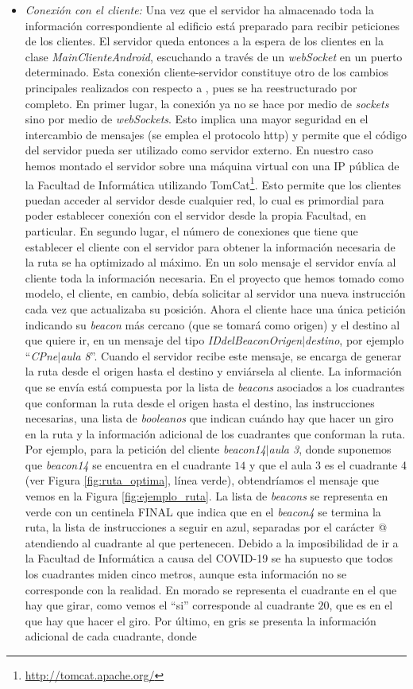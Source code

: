 \begin{itemize}
	\item \textit{Conexión con el cliente:} Una vez que el servidor ha almacenado toda la información correspondiente al edificio está preparado para recibir peticiones de los clientes. El servidor queda entonces a la espera de los clientes en la clase \textit{MainClienteAndroid}, escuchando a través de un \textit{webSocket} en un puerto determinado. Esta conexión cliente-servidor constituye otro de los cambios principales realizados con respecto a \cite{TFGguia}, pues se ha reestructurado por completo. En primer lugar, la conexión ya no se hace por medio de \textit{sockets} sino por medio de \textit{webSockets}. Esto implica una mayor seguridad en el intercambio de mensajes (se emplea el protocolo http) y permite que el código del servidor pueda ser utilizado como servidor externo. En nuestro caso hemos montado el servidor sobre una máquina virtual con una IP pública de la Facultad de Informática utilizando TomCat\footnote{\url{http://tomcat.apache.org/}}. Esto permite que los clientes puedan acceder al servidor desde cualquier red, lo cual es primordial para poder establecer conexión con el servidor desde la propia Facultad, en particular. En segundo lugar, el número de conexiones que tiene que establecer el cliente con el servidor para obtener la información necesaria de la ruta se ha optimizado al máximo. En un solo mensaje el servidor envía al cliente toda la información necesaria. En el proyecto que hemos tomado como modelo, el cliente, en cambio, debía solicitar al servidor una nueva instrucción cada vez que actualizaba su posición. Ahora el cliente hace una única petición indicando su \textit{beacon} más cercano (que se tomará como origen) y el destino al que quiere ir, en un mensaje del tipo \textit{IDdelBeaconOrigen$|$destino}, por ejemplo ``\textit{CPne$|$aula 8}''. Cuando el servidor recibe este mensaje, se encarga de generar la ruta desde el origen hasta el destino y enviársela al cliente. La información que se envía está compuesta por la lista de \textit{beacons} asociados a los cuadrantes que conforman la ruta desde el origen hasta el destino, las instrucciones necesarias, una lista de \textit{booleanos} que indican cuándo hay que hacer un giro en la ruta y la información adicional de los cuadrantes que conforman la ruta. Por ejemplo, para la petición del cliente \textit{beacon14$|$aula 3}, donde suponemos que \textit{beacon14} se encuentra en el cuadrante $14$ y que el aula 3 es el cuadrante 4 (ver Figura \ref{fig:ruta_optima}, línea verde), obtendríamos el mensaje que vemos en la Figura \ref{fig:ejemplo_ruta}. La lista de \textit{beacons} se representa en verde con un centinela FINAL que indica que en el \textit{beacon4} se termina la ruta, la lista de instrucciones a seguir en azul, separadas por el carácter @ atendiendo al cuadrante al que pertenecen. Debido a la imposibilidad de ir a la Facultad de Informática a causa del COVID-19 se ha supuesto que todos los cuadrantes miden cinco metros, aunque esta información no se corresponde con la realidad. En morado se representa el cuadrante en el que hay que girar, como vemos el ``si'' corresponde al cuadrante $20$, que es en el que hay que hacer el giro. Por último, en gris se presenta la información adicional de cada cuadrante, donde 
\end{itemize}
